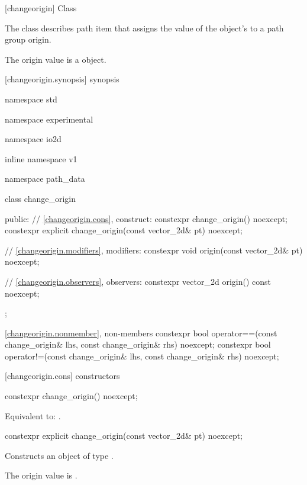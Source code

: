  [changeorigin] {Class }%

\pnum
{}%
The class  describes path item that assigns the value of the  object's  to a path group origin.

\pnum
The origin value is a  object.

 [changeorigin.synopsis] { synopsis}%

\begin{codeblock}
namespace std { namespace experimental { namespace io2d { inline namespace v1 {
  namespace path_data {
    class change_origin {
    public:
      // \ref{changeorigin.cons}, construct:
      constexpr change_origin() noexcept;
      constexpr explicit change_origin(const vector_2d& pt) noexcept;

      // \ref{changeorigin.modifiers}, modifiers:
      constexpr void origin(const vector_2d& pt) noexcept;

      // \ref{changeorigin.observers}, observers:
      constexpr vector_2d origin() const noexcept;
    };
    
    \ref{changeorigin.nonmember}, non-members
    constexpr bool operator==(const change_origin& lhs,
      const change_origin& rhs) noexcept;
    constexpr bool operator!=(const change_origin& lhs,
      const change_origin& rhs) noexcept;
  }
} } } }
\end{codeblock}

 [changeorigin.cons] { constructors}%

%
\begin{itemdecl}
constexpr change_origin() noexcept;
\end{itemdecl}
\begin{itemdescr}
\pnum
\effects
Equivalent to: .
\end{itemdescr}

%
\begin{itemdecl}
constexpr explicit change_origin(const vector_2d& pt) noexcept;
\end{itemdecl}
\begin{itemdescr}
\pnum
\effects
Constructs an object of type .

\pnum
The origin value is .
\end{itemdescr}

